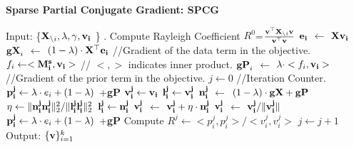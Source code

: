 \documentclass{llncs}
\begin{document}
\begin{algorithm}[htdp]
\small \caption{\bf Sparse Partial Conjugate Gradient: SPCG}
\label{algo2}
\begin{algorithmic}[1]
\STATE Input:  \{${\bf X}_{\backslash i},\lambda,\gamma, {\bf v_i}$ \} .
\STATE Compute Rayleigh Coefficient $R^0$=$\frac{{\bf v}^{\top}{\bf X}_{\backslash i}{\bf v}}{{\bf v}^{\top}{\bf v}}$
\STATE ${\bf e_i}$ $\gets$ ${\bf X}{\bf v_i}$ 
\STATE ${\bf gX}_i$ $\gets$ $(1-\lambda)\cdot{\bf X^{\top}e_i}$  //Gradient of the data term in the objective.
\STATE $f_i  \gets  <{\bf M^s_i, \bf v_i}>$ // $<,>$ indicates inner product.
\STATE ${\bf gP}_i$ $\gets$ $\lambda\cdot <f_i,{\bf v_i}>$   //Gradient of the prior term in the objective.
\STATE $j \gets 0$ //Iteration Counter.
\STATE ${\bf p_i^j} \gets \lambda\cdot e_i + (1-\lambda)$ +{\bf gP}
\STATE ${\bf v_i^j} \gets {\bf v_i}$
\STATE ${\bf l_i^j} \gets {\bf v_i^j}$
\STATE ${\bf n_i^{j}}$ $\gets$ $(1-\lambda)\cdot {\bf gX} + {\bf gP}$
\STATE $\eta \gets  \|{\bf n_i^{j}}{\bf n_i^{j}}\|_2^2 / \|{\bf l_i^j}{\bf l_i^j}\|_2^2$
\STATE ${\bf l_i^j} \gets {\bf n_i^j}$
\STATE ${\bf v_i^{j}}$ $\gets$ $ {\bf v_i^{j}} + \eta\cdot {\bf n_i^{j}}$
\STATE  ${\bf v_i^j}$ $\gets$ ${\bf v_i^j}/\|{\bf v_i^j}\|$
\STATE ${\bf p_i^j} \gets \lambda\cdot e_i + (1-\lambda)$ +{\bf gP}
\STATE Compute $R^j \gets <p_i^j,p_i^j>/<v_i^j,v_i^j>$ 
\STATE $j \gets j+1$
\ENDWHILE
\STATE Output:  $\{{\bf v}\}_{i=1}^{k}$
\end{algorithmic}
\end{algorithm}

\end{document}

